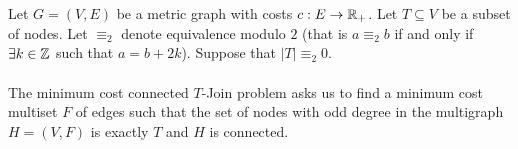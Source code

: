 \documentclass[letterpaper,12pt,oneside,onecolumn]{article}
\begin{document}
\section{}
\paragraph{}
Let $G=(V,E)$ be a metric graph with costs $c: E \rightarrow \mathbb{R}_+$. Let $T \subseteq V$ be a subset of nodes. Let $\equiv_2$ denote equivalence modulo $2$ (that is $a \equiv_2 b$ if and only if $\exists k \in \mathbb{Z}$ such that $a = b + 2k$). Suppose that $|T| \equiv_2 0$.
\paragraph{}
The minimum cost connected $T$-Join problem asks us to find a minimum cost multiset $F$ of edges such that the set of nodes with odd degree in the multigraph $H=(V,F)$ is exactly $T$ and $H$ is connected.
\end{document}
